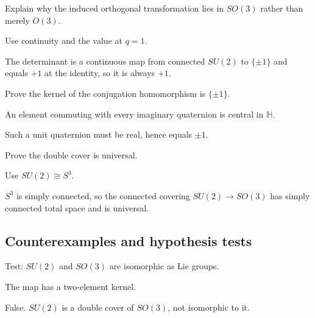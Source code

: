 \begin{exercise}[Orientation]\label{exr:viii13-ped-07}
Explain why the induced orthogonal transformation lies in $SO(3)$ rather than merely $O(3)$.
\end{exercise}
\begin{hint}
Use continuity and the value at $q=1$.
\end{hint}
\begin{solution}
The determinant is a continuous map from connected $SU(2)$ to $\{\pm1\}$ and equals $+1$ at the identity, so it is always $+1$.
\end{solution}

\begin{exercise}[Kernel]\label{exr:viii13-ped-08}
Prove the kernel of the conjugation homomorphism is $\{\pm1\}$.
\end{exercise}
\begin{hint}
An element commuting with every imaginary quaternion is central in $\mathbb H$.
\end{hint}
\begin{solution}
Such a unit quaternion must be real, hence equals $\pm1$.
\end{solution}

\begin{exercise}\label{exr:viii13-ped-09}
Prove the double cover is universal.
\end{exercise}
\begin{hint}
Use $SU(2)\cong S^3$.
\end{hint}
\begin{solution}
$S^3$ is simply connected, so the connected covering $SU(2)\to SO(3)$ has simply connected total space and is universal.
\end{solution}

\subsection*{Counterexamples and hypothesis tests}

\begin{exercise}[$SU(2)=SO(3)$]\label{exr:viii13-ped-10}
Test: $SU(2)$ and $SO(3)$ are isomorphic as Lie groups.
\end{exercise}
\begin{hint}
The map has a two-element kernel.
\end{hint}
\begin{solution}
False. $SU(2)$ is a double cover of $SO(3)$, not isomorphic to it.
\end{solution}

